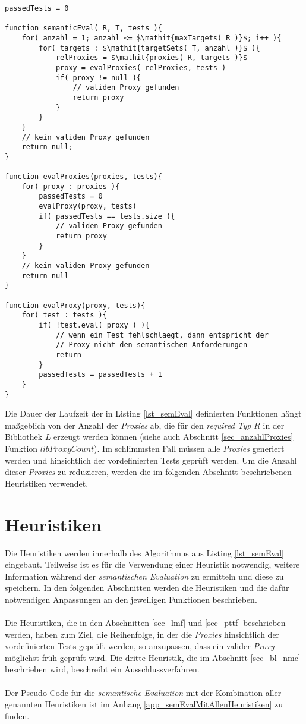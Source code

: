 \begin{lstlisting}[style = pseudo, caption = Semantische Evaluation ohne Heuristiken, captionpos = b, label = lst_semEval]
passedTests = 0

function semanticEval( R, T, tests ){
	for( anzahl = 1; anzahl <= $\mathit{maxTargets( R )}$; i++ ){
		for( targets : $\mathit{targetSets( T, anzahl )}$ ){
			relProxies = $\mathit{proxies( R, targets )}$
			proxy = evalProxies( relProxies, tests )	
			if( proxy != null ){
				// validen Proxy gefunden
				return proxy
			}
		}
	}
	// kein validen Proxy gefunden
	return null;
}

function evalProxies(proxies, tests){
	for( proxy : proxies ){
		passedTests = 0
		evalProxy(proxy, tests)
		if( passedTests == tests.size ){
			// validen Proxy gefunden
			return proxy
		}
	}
	// kein validen Proxy gefunden
	return null
}

function evalProxy(proxy, tests){
	for( test : tests ){
		if( !test.eval( proxy ) ){
			// wenn ein Test fehlschlaegt, dann entspricht der 
			// Proxy nicht den semantischen Anforderungen
			return
		}
		passedTests = passedTests + 1
	}
}
\end{lstlisting}
Die Dauer der Laufzeit der in Listing \ref{lst_semEval} definierten Funktionen hängt maßgeblich von der Anzahl der \emph{Proxies} ab, die für den \emph{required Typ} $R$ in der Bibliothek $L$ erzeugt werden können (siehe auch Abschnitt \ref{sec_anzahlProxies} Funktion $\mathit{libProxyCount}$). Im schlimmsten Fall müssen alle \emph{Proxies} generiert werden und hinsichtlich der vordefinierten Tests geprüft werden. Um die Anzahl dieser \emph{Proxies} zu reduzieren, werden die im folgenden Abschnitt beschriebenen Heuristiken verwendet.


\section{Heuristiken}\label{sec_heuristics}
Die \Gls{Heuristik}en werden innerhalb des Algorithmus aus Listing \ref{lst_semEval} eingebaut. Teilweise ist es für die Verwendung einer \Gls{Heuristik} notwendig, weitere Information während der \emph{semantischen Evaluation} zu ermitteln und diese zu speichern. In den folgenden Abschnitten werden die \Gls{Heuristik}en und die dafür notwendigen Anpassungen an den jeweiligen Funktionen beschrieben.
\\\\
Die \Gls{Heuristik}en, die in den Abschnitten \ref{sec_lmf} und \ref{sec_pttf} beschrieben werden, haben zum Ziel, die Reihenfolge, in der die \emph{Proxies} hinsichtlich der vordefinierten Tests geprüft werden, so anzupassen, dass ein valider \emph{Proxy} möglichst früh geprüft wird. Die dritte Heuristik, die im Abschnitt \ref{sec_bl_nmc} beschrieben wird, beschreibt ein Ausschlussverfahren.
\\\\
Der Pseudo-Code für die \emph{semantische Evaluation} mit der Kombination aller genannten \Gls{Heuristik}en ist im Anhang \ref{app_semEvalMitAllenHeuristiken} zu finden.


